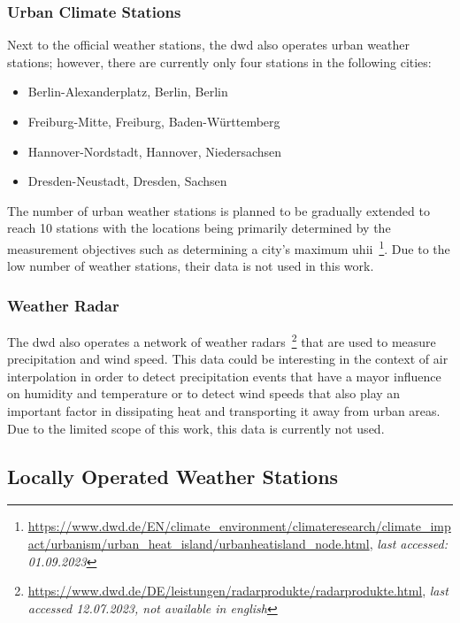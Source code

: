 \subsubsection{Urban Climate Stations}

Next to the official weather stations, the \gls{dwd} also operates urban weather stations; however, there are currently only four stations in the following cities:

\begin{itemize}
    \item Berlin-Alexanderplatz, Berlin, Berlin
    \item Freiburg-Mitte, Freiburg, Baden-Württemberg
    \item Hannover-Nordstadt, Hannover, Niedersachsen
    \item Dresden-Neustadt, Dresden, Sachsen
\end{itemize}

The number of urban weather stations is planned to be gradually extended to reach 10 stations with the locations being primarily determined by the measurement objectives such as determining a city's maximum \gls{uhii}~\footnote{\url{https://www.dwd.de/EN/climate\_environment/climateresearch/climate\_impact/urbanism/urban\_heat\_island/urbanheatisland\_node.html}, \textit{last accessed: 01.09.2023}}. Due to the low number of weather stations, their data is not used in this work.

\subsubsection{Weather Radar}

The \gls{dwd} also operates a network of weather radars~\footnote{\url{https://www.dwd.de/DE/leistungen/radarprodukte/radarprodukte.html}, \textit{last accessed 12.07.2023, not available in english}} that are used to measure precipitation and wind speed. This data could be interesting in the context of air interpolation in order to detect precipitation events that have a mayor influence on humidity and temperature or to detect wind speeds that also play an important factor in dissipating heat and transporting it away from urban areas. Due to the limited scope of this work, this data is currently not used.

\subsection{Locally Operated Weather Stations}

